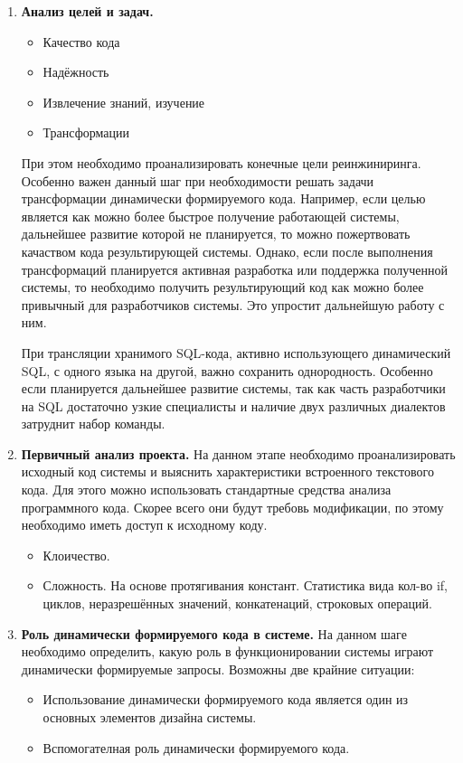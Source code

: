 \begin{enumerate}
  \item \textbf{Анализ целей и задач.}
  \begin{itemize}
    \item Качество кода
    \item Надёжность
    \item Извлечение знаний, изучение
    \item Трансформации
  \end{itemize}
  
  При этом необходимо проанализировать конечные цели реинжиниринга. Особенно важен данный шаг при необходимости решать задачи трансформации динамически формируемого кода. Например, если целью является как можно более быстрое получение работающей системы, дальнейшее развитие которой не планируется, то можно пожертвовать качаством кода результирующей системы. Однако, если после выполнения трансформаций планируется активная разработка или поддержка полученной системы, то необходимо получить результирующий код как можно более привычный для разработчиков системы. Это упростит дальнейшую работу с ним.
  
  При трансляции хранимого SQL-кода, активно использующего динамический SQL, с одного языка на другой, важно сохранить однородность. Особенно если планируется дальнейшее развитие системы, так как часть разработчики на SQL достаточно узкие специалисты и наличие двух различных диалектов затруднит набор команды.
  
  \item \textbf{Первичный анализ проекта.} На данном этапе необходимо проанализировать исходный код системы и выяснить характеристики встроенного текстового кода. Для этого можно использовать стандартные средства анализа программного кода. Скорее всего они будут требовь модификации, по этому необходимо иметь доступ к исходному коду.
  \begin{itemize}
    \item Клоичество. 
    \item Сложность. На основе протягивания констант. Статистика вида кол-во if, циклов, неразрешённых значений, конкатенаций, строковых операций.
  \end{itemize}
  
  \item \textbf{Роль динамически формируемого кода в системе.} На данном шаге необходимо определить, какую роль в функционировании системы играют динамически формируемые запросы. Возможны две крайние ситуации:
  \begin{itemize}
    \item Использование динамически формируемого кода является один из основных элементов дизайна системы.
    \item Вспомогателная роль динамически формируемого кода.
  \end{itemize}
  

\end{enumerate}

